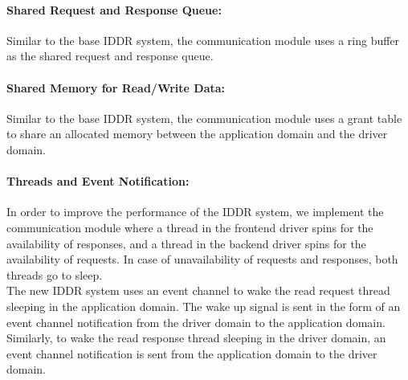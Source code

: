 \paragraph{Shared Request and Response Queue:}
Similar to the base IDDR system, the communication module uses a ring buffer as the shared request and response queue. 

\paragraph{Shared Memory for Read/Write Data:}
Similar to the base IDDR system, the communication module uses a grant table to share an allocated memory between the application domain and the driver domain. 

\paragraph{Threads and Event Notification:}
In order to improve the performance of the IDDR system, we implement the communication module where a thread in the frontend driver spins for the availability of responses, and a thread in the backend driver spins for the availability of requests. In case of unavailability of requests and responses, both threads go to sleep. 
\\[3mm] 
The new IDDR system uses an event channel to wake the read request thread sleeping in the application domain. The wake up signal is sent in the form of an event channel notification from the driver domain to the application domain. Similarly, to wake the read response thread sleeping in the driver domain, an event channel notification is sent from the application domain to the driver domain.

